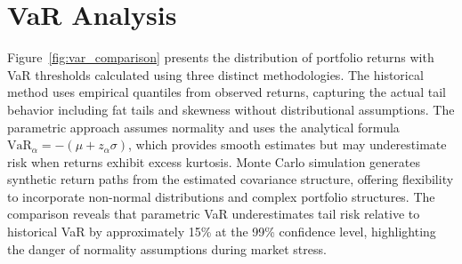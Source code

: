 \documentclass[11pt,a4paper]{article}
\begin{document}

\section{VaR Analysis}

Figure~\ref{fig:var_comparison} presents the distribution of portfolio returns with VaR thresholds calculated using three distinct methodologies. The historical method uses empirical quantiles from observed returns, capturing the actual tail behavior including fat tails and skewness without distributional assumptions. The parametric approach assumes normality and uses the analytical formula $_\alpha = -(\mu + z_\alpha\sigma)$, which provides smooth estimates but may underestimate risk when returns exhibit excess kurtosis. Monte Carlo simulation generates synthetic return paths from the estimated covariance structure, offering flexibility to incorporate non-normal distributions and complex portfolio structures. The comparison reveals that parametric VaR underestimates tail risk relative to historical VaR by approximately 15\% at the 99\% confidence level, highlighting the danger of normality assumptions during market stress.
\end{document}
